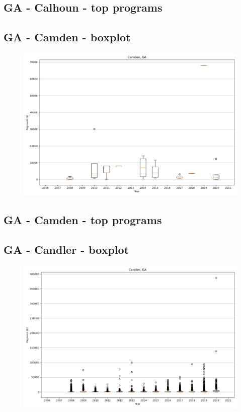 \subsection*{GA - Calhoun - top programs}

\newpage
\subsection*{GA - Camden - boxplot}
\begin{figure}[h]
\centering
\includegraphics[width=7in]{../output/boxplots/counties/Camden-GA_boxplot.png}
\end{figure}


\subsection*{GA - Camden - top programs}

\newpage
\subsection*{GA - Candler - boxplot}
\begin{figure}[h]
\centering
\includegraphics[width=7in]{../output/boxplots/counties/Candler-GA_boxplot.png}
\end{figure}


